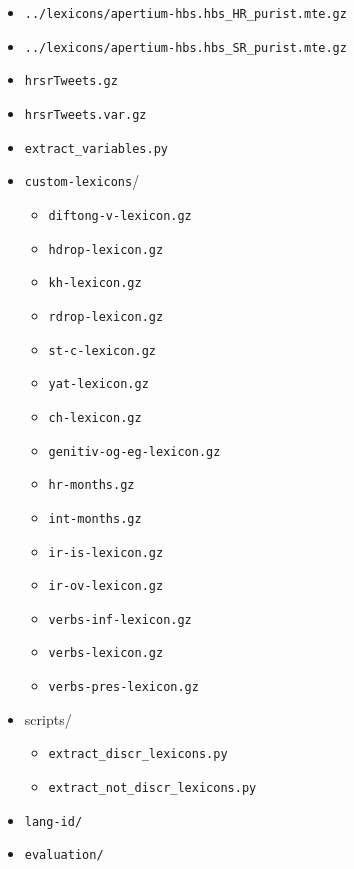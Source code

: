 \documentclass[a4paper]{article}
\begin{document}
\begin{itemize}
\item \texttt{../lexicons/apertium-hbs.hbs\_HR\_purist.mte.gz}
\item \texttt{../lexicons/apertium-hbs.hbs\_SR\_purist.mte.gz}
\item \texttt{hrsrTweets.gz}%
\item \texttt{hrsrTweets.var.gz}%
\item \texttt{extract\_variables.py}
\item \texttt{custom-lexicons}/
\begin{itemize}
\item \texttt{diftong-v-lexicon.gz} %
\item \texttt{hdrop-lexicon.gz} %
\item \texttt{kh-lexicon.gz} %
\item \texttt{rdrop-lexicon.gz} %
\item \texttt{st-c-lexicon.gz} %
\item \texttt{yat-lexicon.gz} %
\item \texttt{ch-lexicon.gz} %
\item \texttt{genitiv-og-eg-lexicon.gz} %
\item \texttt{hr-months.gz} %
\item \texttt{int-months.gz} %
\item \texttt{ir-is-lexicon.gz} %
\item \texttt{ir-ov-lexicon.gz} %
\item \texttt{verbs-inf-lexicon.gz} %
\item \texttt{verbs-lexicon.gz} %
\item \texttt{verbs-pres-lexicon.gz} %
\end{itemize}
\item scripts/
\begin{itemize}
\item \texttt{extract\_discr\_lexicons.py}
\item \texttt{extract\_not\_discr\_lexicons.py}
\end{itemize}
\item \texttt{lang-id/}
\item \texttt{evaluation/}
\end{itemize}
\end{document}
